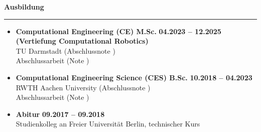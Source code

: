 \documentclass[12pt]{article} %
\newcommand{\HighlightedText}[1] {{\textbf{#1}}}
\newcommand{\PlaceAndTime}[2] {\HighlightedText{#1} \hfill \HighlightedText{#2}}
\newenvironment{ItemizeSection}[1]{
    \vspace{1mm}
    \HighlightedText{#1}
    \vspace{0.5mm}
    {\color{custom_blue} \hrule}
    \begin{itemize}[left=0.5em, topsep=0pt, itemsep=0pt, label={$\bullet$}]
}{
    \end{itemize}
}
\begin{document}
\begin{ItemizeSection}{Ausbildung}
    \item \PlaceAndTime{Computational Engineering (CE) M.Sc.}{04.2023 -- 12.2025} \\
    \textbf{(Vertiefung Computational Robotics)} \\
    TU Darmstadt (Abschlussnote ) \\
    Abschlussarbeit (Note )

    \item \PlaceAndTime{Computational Engineering Science (CES) B.Sc.}{10.2018 -- 04.2023} \\
    RWTH Aachen University (Abschlussnote ) \\
    Abschlussarbeit (Note )

    \item \PlaceAndTime{Abitur}{09.2017 -- 09.2018} \\
     Studienkolleg an Freier Universität Berlin, technischer Kurs

\end{ItemizeSection}
\end{document}
